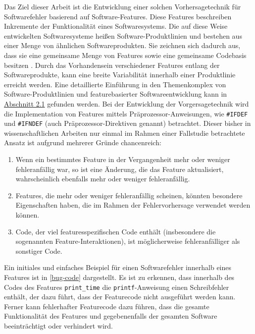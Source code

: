 Das Ziel dieser Arbeit ist die Entwicklung einer solchen Vorhersagetechnik für Softwarefehler basierend auf Software-Features. Diese Features beschreiben Inkremente der Funktionalität eines Softwaresystems. Die auf diese Weise entwickelten Softwaresysteme heißen Software-Produktlinien und bestehen aus einer Menge von ähnlichen Softwareprodukten. Sie zeichnen sich dadurch aus, dass sie eine gemeinsame Menge von Features sowie eine gemeinsame Codebasis besitzen \cite{Thuem2014}. Durch das Vorhandensein verschiedener Features entlang der Softwareprodukte, kann eine breite Variabilität innerhalb einer Produktlinie erreicht werden. Eine detaillierte Einführung in den Themenkomplex von Software-Produktlinien und featurebasierter Softwareentwicklung kann in \hyperref[feat-develop]{Abschnitt 2.1} gefunden werden. Bei der Entwicklung der Vorgersagetechnik wird die Implementation von Features mittels Präprozessor-Anweisungen, wie \texttt{\#IFDEF} und \texttt{\#IFNDEF} (auch Präprozessor-Direktiven genannt) betrachtet. Dieser bisher in wissenschaftlichen Arbeiten nur einmal im Rahmen einer Fallstudie betrachtete Ansatz \cite{Queiroz2016} ist aufgrund mehrerer Gründe chancenreich:

\begin{enumerate}
\setlength{\itemsep}{-2pt}
\item Wenn ein bestimmtes Feature in der Vergangenheit mehr oder weniger fehleranfällig war, so ist eine Änderung, die das Feature aktualisiert, wahrscheinlich ebenfalls mehr oder weniger fehleranfällig. 
\item Features, die mehr oder weniger fehleranfällig scheinen, könnten besondere Eigenschaften haben, die im Rahmen der Fehlervorhersage verwendet werden können.
\item Code, der viel featuresspezifischen Code enthält (insbesondere die sogenannten Feature-Interaktionen), ist möglicherweise fehleranfälliger als sonstiger Code.
\end{enumerate}

Ein initiales und einfaches Beispiel für einen Softwarefehler innerhalb eines Features ist in \autoref{bug-code} dargestellt. Es ist zu erkennen, dass innerhalb des Codes des Features \texttt{print\_time} die \texttt{printf}-Anweisung einen Schreibfehler enthält, der dazu führt, dass der Featurecode nicht ausgeführt werden kann. Ferner kann fehlerhafter Featurecode dazu führen, dass die gesamte Funktionalität des Features und gegebenenfalls der gesamten Software beeinträchtigt oder verhindert wird.

